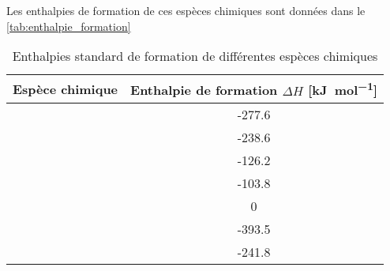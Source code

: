 Les enthalpies de formation de ces espèces chimiques sont données dans le \autoref{tab:enthalpie_formation}

\begin{table}[h]
    \centering
    \begin{tabulary}{\linewidth}{C C}
        \toprule
        Espèce chimique & Enthalpie de formation \(\Delta H\) [\si{\kilo\joule\per\mole}] \\
        \midrule
         & -277.6 \\
         & -238.6 \\
         & -126.2 \\
         & -103.8 \\
         & 0 \\
         & -393.5 \\
         & -241.8 \\
        \bottomrule
    \end{tabulary}
    \caption{Enthalpies standard de formation de différentes espèces chimiques \cite{enthalpies}}
    \label{tab:enthalpie_formation}
\end{table}
